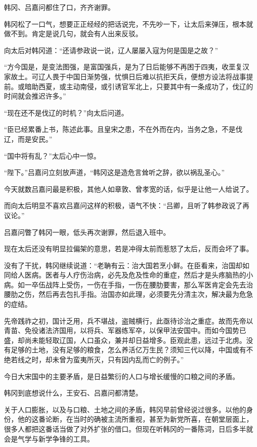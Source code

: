 韩冈、吕嘉问都住了口，齐齐谢罪。

韩冈松了一口气，想要正正经经的把话说完，不先吵一下，让太后来弹压，根本就做不到。肯定是说几句，就会有人出来反驳。

向太后对韩冈道：“还请参政说一说，辽人屡屡入寇为何是国是之故？”

“方今国是，是变法图强，是富国强兵，是为了日后能够不再困于四夷，收垩复汉家故土。可辽人畏于中国日渐势强，忧惧日后难以抗拒天兵，便想方设法将战事提前。或暗助西夏，或主动南侵，或引诱官军北上，只要其中有一条成功了，伐辽的时间就会推迟许多。”

“现在还不是伐辽的时机？”向太后问道。

“臣已经累番上书，陈述此事。且皇宋之患，不在外而在内，当务之急，不是伐辽，而是安民。”

“国中将有乱？”太后心中一惊。

“陛下。”吕嘉问立刻放声道，“韩冈这是造危言耸听之辞，欲以祸乱圣心。”

今天就数吕嘉问最是积极，其他人如章敦、曾孝宽的话，似乎是让他一人给说了。

而向太后明显不喜欢吕嘉问这样的积极，语气不快：“吕卿，且听了韩参政说了再议论。”

吕嘉问瞥了韩冈一眼，低头再次谢罪，然后退入班中。

现在太后还没有明显拉偏架的意思，若是冲得太前而惹怒了太后，反而会坏了事。

没有了干扰，韩冈继续说道：“老聃有云：治大国若烹小鲜。在臣看来，治国却如同给人医病。医者与人疗伤治病，必先及危及性命的重症，然后才是头疼脑热的小病。如一卒伍战阵上受伤，一伤在手指，一伤在腰肋要害，那么军医肯定会先去治腰肋之伤，然后再去包扎手指。治国亦如此理，必须要先分清主次，解决最为危急的症结。

先帝践祚之初，国计乏用，兵不堪战，盗贼横行，此亟待诊治之重症。故而先帝以青苗、免役诸法济国用，以将兵、军器练军卒，以保甲法安国中。而如今国势已盛，却尚未能轻取辽国，人口虽众，兼并却日益增多。臣观此患，远过于北虏。没有足够的土地，没有足够的粮食，怎么养活亿万生民？须知三代以降，中国或有不绝若线之时，却未曾为蛮夷所灭，只有因内乱而亡的例子。”

今日大宋国中的主要矛盾，是日益繁衍的人口与增长缓慢的口粮之间的矛盾。

韩冈到底想说什么，王安石、吕嘉问都清楚。

关于人口膨胀，以及与口粮、土地之间的矛盾，韩冈早前曾经说过很多。以他的身份，他的这番论断，在当时的确被主流所重视，甚至为新党所喜，在朝堂层面上，很多人都把这番话当做了对外扩张的借口。但现在听韩冈的一番陈词，日后多半就会是气学与新学争锋的工具。

